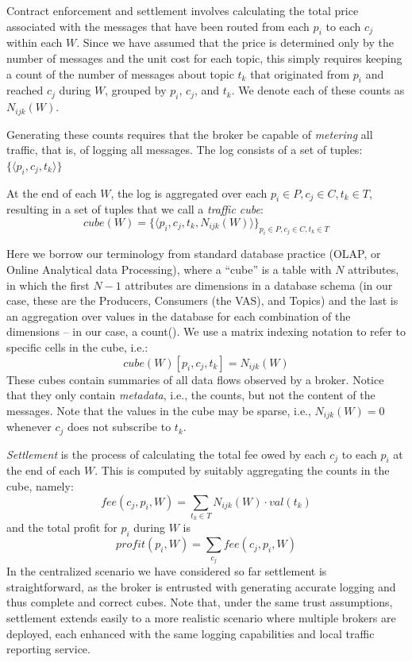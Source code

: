\documentclass[chi_draft]{sigchi}
\begin{document}
Contract enforcement and settlement involves calculating the total price associated with the messages that have been routed from each $ p_i $ to each $ c_j $ within each $W$.
Since we have assumed that the price is  determined only by the number of messages and the unit cost for each topic, this simply requires keeping a count of the number of messages about topic $t_k$ that originated from $p_i$ and reached $c_j$ during $W$, grouped by $ p_i $, $ c_j $, and $ t_k $.
We denote each of these counts as $N_{ijk}(W)$.

Generating these counts requires that the broker be capable of \textit{metering} all traffic, that is, of logging all messages.
The log consists of a set of tuples:
$ \{\langle p_i, c_j, t_k \rangle  \} $

At the end of each $W$, the log is aggregated over each $p_i \in P, c_j \in C, t_k \in T$, resulting in a set of tuples that we call a \textit{traffic cube}:
\begin{equation}\label{eq:cube}
\mathit{cube}(W) = \{ \langle p_i, c_j, t_k, N_{ijk}(W) \rangle \}_{p_i \in P, c_j \in C, t_k \in T}
\end{equation}

Here we borrow our terminology from standard database practice (OLAP, or Online Analytical data Processing), where a  ``cube'' is a table with $ N $ attributes, in which the first $ N-1 $ attributes are  dimensions in a database schema (in our case, these are the Producers, Consumers (the VAS), and Topics) and the last is an aggregation over values in the database for each combination of the dimensions -- in our case, a count().
We use a matrix indexing notation to refer to specific cells in the cube, i.e.:
\[ \mathit{cube}(W)[p_i, c_j, t_k] = N_{ijk}(W) \] 
These cubes contain summaries of all data flows observed by a broker. Notice that they only contain \textit{metadata}, i.e., the counts, but not the content of the messages.
%
Note that the values in the cube may be sparse, i.e., $N_{ijk}(W) = 0$ whenever $c_j$ does not subscribe to $t_k$.

\textit{Settlement} is the process of calculating the total fee owed by each $ c_j $ to each $ p_i $ at the end of each $W$.
This is computed by suitably aggregating the counts in the cube, namely:
\begin{equation}
\mathit{fee}(c_j, p_i, W) = \sum_{t_k \in T} N_{ijk}(W) \cdot \mathit{val}(t_k)
\label{eq:balance}
\end{equation}
and the total profit for $ p_i  $ during $W$ is
\begin{equation}
\mathit{profit}(p_i, W) = \sum_{c_j} \mathit{fee}(c_j, p_i, W)
\label{eq:reward}
\end{equation}
In the centralized scenario we have considered so far settlement is straightforward, as the broker is entrusted with generating accurate logging and thus complete and correct cubes.
Note that, under the same trust assumptions, settlement extends easily to a more realistic scenario where multiple brokers are deployed, each enhanced with the same logging capabilities and local traffic reporting service.
\end{document}
